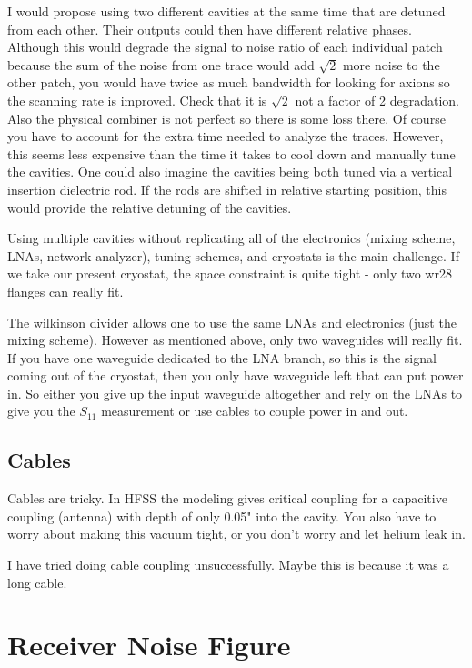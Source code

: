 \documentclass[11pt]{article}
\begin{document}
I would propose using two different cavities at the same time that are detuned from each other. Their outputs could then have different relative phases. Although this would degrade the signal to noise ratio of each individual patch because the sum of the noise from one trace would add $\sqrt{2}$ more noise to the other patch, you would have twice as much bandwidth for looking for axions so the scanning rate is improved. Check that it is $\sqrt{2}$ not a factor of 2 degradation. Also the physical combiner is not perfect so there is some loss there. Of course you have to account for the extra time needed to analyze the traces. However, this seems less expensive than the time it takes to cool down and manually tune the cavities. One could also imagine the cavities being both tuned via a vertical insertion dielectric rod. If the rods are shifted in relative starting position, this would provide the relative detuning of the cavities.

Using multiple cavities without replicating all of the electronics (mixing scheme, LNAs, network analyzer), tuning schemes, and cryostats is the main challenge. If we take our present cryostat, the space constraint is quite tight - only two wr28 flanges can really fit.

The wilkinson divider allows one to use the same LNAs and electronics (just the mixing scheme). However as mentioned above, only two waveguides will really fit. If you have one waveguide dedicated to the LNA branch, so this is the signal coming out of the cryostat, then you only have waveguide left that can put power in. So either you give up the input waveguide altogether and rely on the LNAs to give you the $S_{11}$ measurement or use cables to couple power in and out.

\subsection{Cables}

Cables are tricky. In HFSS the modeling gives critical coupling for a capacitive coupling (antenna) with depth of only 0.05" into the cavity. You also have to worry about making this vacuum tight, or you don't worry and let helium leak in.

I have tried doing cable coupling unsuccessfully. Maybe this is because it was a long cable.

\section{Receiver Noise Figure}
\end{document}
